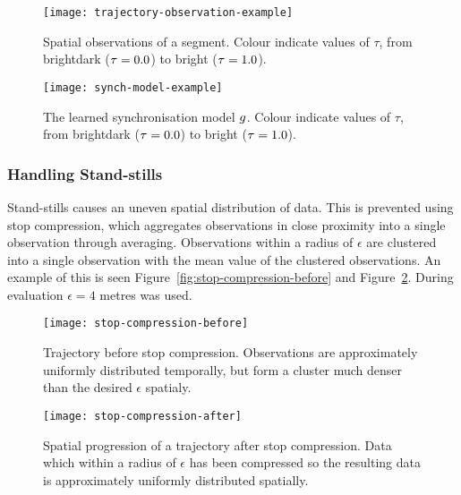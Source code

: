 \begin{figure}
  \begin{minipage}{.46\textwidth}
    \texttt{[image: trajectory-observation-example]}
    \caption{Spatial observations of a segment. Colour indicate values
      of $\tau$, from brightdark ($\tau=0.0$) to bright ($\tau=1.0$).}\label{fig:seg-9-observations}
  \end{minipage}
  \hspace{5pt}
  \begin{minipage}{.46\textwidth}
    \texttt{[image: synch-model-example]}
    \caption{The learned synchronisation model $g$. Colour indicate values
      of $\tau$, from brightdark ($\tau=0.0$) to bright ($\tau=1.0$).}\label{fig:seg-9-g}
  \end{minipage}
\end{figure}

\subsubsection{Handling Stand-stills}\label{sec:stop-compression}
Stand-stills causes an uneven spatial distribution of data. This is
prevented using stop compression, which aggregates observations in close proximity into a
single observation through averaging. Observations within a radius of
$\epsilon$ are clustered into a single observation with the mean value of
the clustered observations. An example of this is seen
Figure~\ref{fig:stop-compression-before} and
Figure~\ref{fig:stop-compression-after}. During evaluation $\epsilon=4$ metres was used. 
\begin{figure}
  \begin{minipage}{.46\textwidth}
    \texttt{[image: stop-compression-before]}
    \caption{Trajectory before stop compression. Observations are 
      approximately uniformly distributed temporally, but form a cluster
      much denser than the desired $\epsilon$ spatialy. }\label{fig:stop-compression-before}
  \end{minipage}
  \hspace{5pt} 
  \begin{minipage}{.46\textwidth}
    \texttt{[image: stop-compression-after]}
    \caption{Spatial progression of a trajectory
      after stop compression. Data which within a radius of $\epsilon$
      has been compressed so the resulting data is
      approximately uniformly distributed spatially.}\label{fig:stop-compression-after}
  \end{minipage}
\end{figure}


